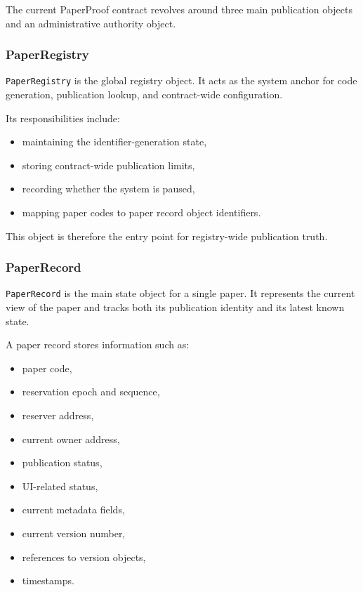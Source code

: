 \documentclass[journal]{IEEEtran}
\begin{document}
The current PaperProof contract revolves around three main publication objects and an administrative authority object.

\subsubsection{PaperRegistry}

\texttt{PaperRegistry} is the global registry object. It acts as the system anchor for code generation, publication lookup, and contract-wide configuration.

Its responsibilities include:
\begin{itemize}
    \item maintaining the identifier-generation state,
    \item storing contract-wide publication limits,
    \item recording whether the system is paused,
    \item mapping paper codes to paper record object identifiers.
\end{itemize}


This object is therefore the entry point for registry-wide publication truth.

\subsubsection{PaperRecord}

\texttt{PaperRecord} is the main state object for a single paper. It represents the current view of the paper and tracks both its publication identity and its latest known state.

A paper record stores information such as:
\begin{itemize}
    \item paper code,
    \item reservation epoch and sequence,
    \item reserver address,
    \item current owner address,
    \item publication status,
    \item UI-related status,
    \item current metadata fields,
    \item current version number,
    \item references to version objects,
    \item timestamps.
\end{itemize}
\end{document}
